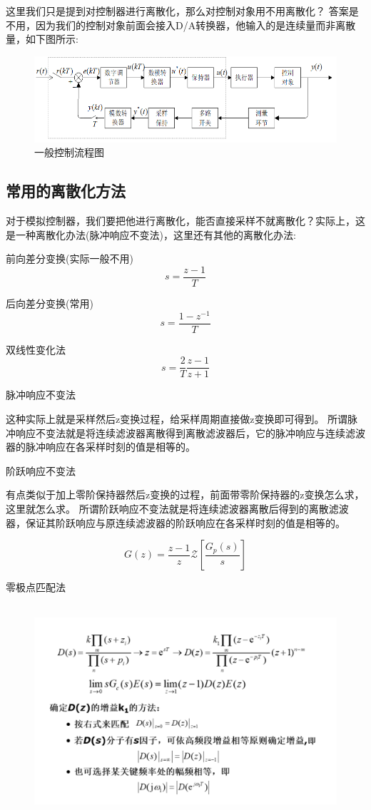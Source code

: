\documentclass[12pt, a4paper, oneside]{ctexbook}
\begin{document}
这里我们只是提到对控制器进行离散化，那么对控制对象用不用离散化？
答案是不用，因为我们的控制对象前面会接入D/A转换器，他输入的是连续量而非离散量，如下图所示:
\begin{figure}[htbp]
	\centering
	\includegraphics[width=12cm,height=3.2cm]{img/5_5.png}
	\caption{一般控制流程图}
\end{figure}

\subsection{常用的离散化方法}
对于模拟控制器，我们要把他进行离散化，能否直接采样不就离散化？实际上，这是一种离散化办法(脉冲响应不变法)，这里还有其他的离散化办法:

前向差分变换(实际一般不用)
$$
s=\frac{z-1}{T}
$$

后向差分变换(常用)
$$
s=\frac{1-z^{-1}}{T}
$$

双线性变化法
$$
s=\frac{2}{T}\frac{z-1}{z+1}
$$

脉冲响应不变法

\noindent 这种实际上就是采样然后z变换过程，给采样周期直接做z变换即可得到。
所谓脉冲响应不变法就是将连续滤波器离散得到离散滤波器后，它的脉冲响应与连续滤波器的脉冲响应在各采样时刻的值是相等的。

阶跃响应不变法

\noindent 有点类似于加上零阶保持器然后z变换的过程，前面带零阶保持器的z变换怎么求，这里就怎么求。
所谓阶跃响应不变法就是将连续滤波器离散后得到的离散滤波器，保证其阶跃响应与原连续滤波器的阶跃响应在各采样时刻的值是相等的。

$$
G(z)=\frac{z-1}{z}\mathcal Z[\frac{G_p(s)}{s}]
$$

零极点匹配法
\begin{figure}[htbp]
	\centering
	\includegraphics[width=12.6cm,height=7.89cm]{img/5_1.png}
\end{figure}
\end{document}
